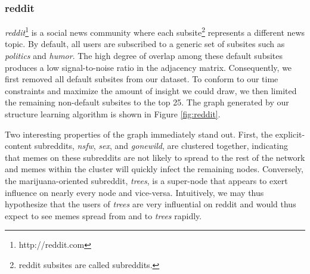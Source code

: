 \documentclass{article} %
\begin{document}
\subsubsection{reddit}
\textit{reddit}\footnote{http://reddit.com} is a social news community where each subsite\footnote{reddit subsites are called subreddits.} represents a different news topic. By default, all users are subscribed to a generic set of subsites such as \textit{politics} and \textit{humor}. The high degree of overlap among these default subsites produces a low signal-to-noise ratio in the adjacency matrix. Consequently, we first removed all default subsites from our dataset. To conform to our time constraints and maximize the amount of insight we could draw, we then limited the remaining non-default subsites to the top 25. The graph generated by our structure learning algorithm is shown in Figure \ref{fig:reddit}.

Two interesting properties of the graph immediately stand out. First, the explicit-content subreddits, \textit{nsfw}, \textit{sex}, and \textit{gonewild}, are clustered together, indicating that memes on these subreddits are not likely to spread to the rest of the network and memes within the cluster will quickly infect the remaining nodes. Conversely, the marijuana-oriented subreddit, \textit{trees}, is a super-node that appears to exert influence on nearly every node and vice-versa. Intuitively, we may thus hypothesize that the users of \textit{trees} are very influential on reddit and would thus expect to see memes spread from and to \textit{trees} rapidly.
\end{document}
